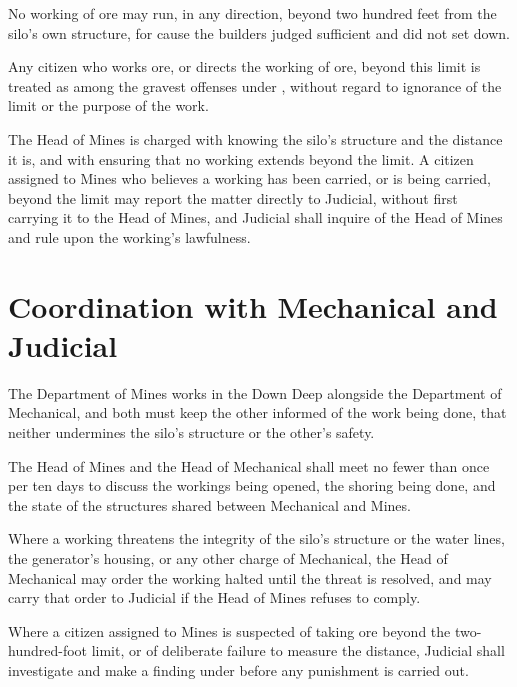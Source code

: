 \begin{clauses}
\item No working of ore may run, in any direction, beyond two hundred feet from the silo's own structure, for cause the builders judged sufficient and did not set down.
\item Any citizen who works ore, or directs the working of ore, beyond this limit is treated as among the gravest offenses under , without regard to ignorance of the limit or the purpose of the work.
\item The Head of Mines is charged with knowing the silo's structure and the distance it is, and with ensuring that no working extends beyond the limit. A citizen assigned to Mines who believes a working has been carried, or is being carried, beyond the limit may report the matter directly to Judicial, without first carrying it to the Head of Mines, and Judicial shall inquire of the Head of Mines and rule upon the working's lawfulness.
\end{clauses}

\section{Coordination with Mechanical and Judicial}
\label{sec:mines:coordination-with-mechanical-and-judicial}

The Department of Mines works in the Down Deep alongside the Department of Mechanical, and both must keep the other informed of the work being done, that neither undermines the silo's structure or the other's safety.

\begin{clauses}
\item The Head of Mines and the Head of Mechanical shall meet no fewer than once per ten days to discuss the workings being opened, the shoring being done, and the state of the structures shared between Mechanical and Mines.
\item Where a working threatens the integrity of the silo's structure or the water lines, the generator's housing, or any other charge of Mechanical, the Head of Mechanical may order the working halted until the threat is resolved, and may carry that order to Judicial if the Head of Mines refuses to comply.
\item Where a citizen assigned to Mines is suspected of taking ore beyond the two-hundred-foot limit, or of deliberate failure to measure the distance, Judicial shall investigate and make a finding under  before any punishment is carried out.
\end{clauses}

